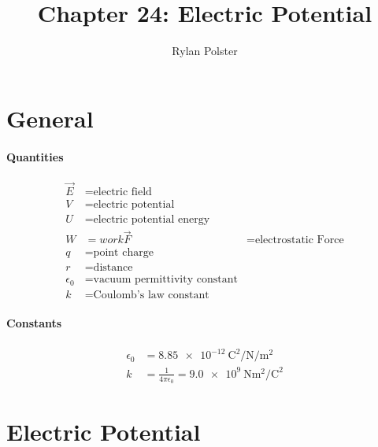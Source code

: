 \documentclass{article}
\title{Chapter 24: Electric Potential}
\author{Rylan Polster}
\begin{document}
    \maketitle
    
    \section*{General}

        \paragraph{Quantities}
        \begin{align}
            \vec{E} &= \text{electric field} \nonumber\\
            V &= \text{electric potential} \nonumber\\
            U &= \text{electric potential energy} \nonumber\\
            W &= work
            \vec{F} &= \text{electrostatic Force} \nonumber\\
            q &= \text{point charge} \nonumber\\
            r &= \text{distance} \nonumber\\
            \epsilon_0 &= \text{vacuum permittivity constant} \nonumber\\
            k &= \text{Coulomb's law constant} \nonumber
        \end{align}

        \paragraph{Constants}
        \begin{align}
            \epsilon_0 &= \SI[per-mode=fraction]{8.85e-12}{\coulomb\squared\per\newton\per\meter\squared} \nonumber\\
            k &= \frac{1}{4 \pi \epsilon_0} = \SI[per-mode=fraction]{9.0e9}{\newton\meter\squared\per\square\coulomb} \nonumber
        \end{align}

    \section{Electric Potential}
\end{document}
